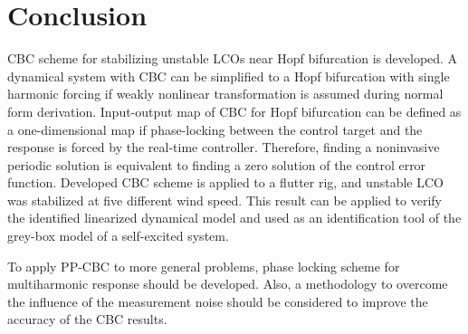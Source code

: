 \documentclass[openacc]{rsproca_new}%
\begin{document}
\section{Conclusion}
CBC scheme for stabilizing unstable LCOs near Hopf bifurcation is developed. A dynamical system with CBC can be simplified to a Hopf bifurcation with single harmonic forcing if weakly nonlinear transformation is assumed during normal form derivation. Input-output map of CBC for Hopf bifurcation can be defined as a one-dimensional map if phase-locking between the control target and the response is forced by the real-time controller. Therefore, finding a noninvasive periodic solution is equivalent to finding a zero solution of the control error function. Developed CBC scheme is applied to a flutter rig, and unstable LCO was stabilized at five different wind speed. This result can be applied to verify the identified linearized dynamical model and used as an identification tool of the grey-box model of a self-excited system.

To apply PP-CBC to more general problems, phase locking scheme for multiharmonic response should be developed. Also, a methodology to overcome the influence of the measurement noise should be considered to improve the accuracy of the CBC results. \vskip6pt


\enlargethispage{20pt}





\end{document}
